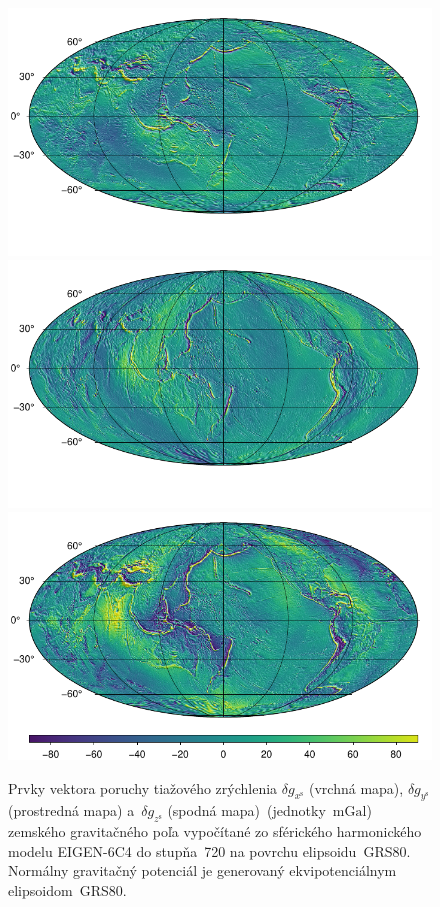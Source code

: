 \documentclass[a4paper, 12pt]{book}
\begin{document}
\begin{figure}
\centering
\includegraphics{./fig-gravity-disturbance-on-grs80-x.pdf}
\includegraphics{./fig-gravity-disturbance-on-grs80-y.pdf}
\includegraphics{./fig-gravity-disturbance-on-grs80-z.pdf}
\caption{Prvky vektora poruchy tiažového zrýchlenia $\delta g_{x^\mathrm{s}}$ 
(vrchná mapa), $\delta g_{y^\mathrm{s}}$ (prostredná mapa) a~$\delta 
g_{z^\mathrm{s}}$ (spodná mapa)~(jednotky~$\mathrm{mGal}$) zemského 
gravitačného poľa vypočítané zo sférického harmonického modelu EIGEN-6C4 do 
stupňa~720 na povrchu elipsoidu~GRS80.  Normálny gravitačný potenciál je 
generovaný ekvipotenciálnym elipsoidom~GRS80.}
\label{fig:dg_ggm_grs80}
\end{figure}
\end{document}
